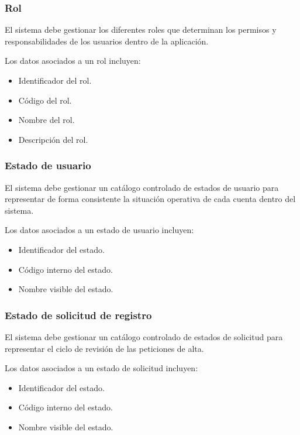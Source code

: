 \subsubsection*{Rol}

El sistema debe gestionar los diferentes roles que determinan los permisos y
responsabilidades de los usuarios dentro de la aplicación.

Los datos asociados a un rol incluyen:

\begin{itemize}
    \item Identificador del rol.
    \item Código del rol.
    \item Nombre del rol.
    \item Descripción del rol.
\end{itemize}

\subsubsection*{Estado de usuario}

El sistema debe gestionar un catálogo controlado de estados de usuario para representar de forma consistente la situación operativa de cada cuenta dentro del sistema.

Los datos asociados a un estado de usuario incluyen:

\begin{itemize}
    \item Identificador del estado.
    \item Código interno del estado.
    \item Nombre visible del estado.
\end{itemize}

\subsubsection*{Estado de solicitud de registro}

El sistema debe gestionar un catálogo controlado de estados de solicitud para representar el ciclo de revisión de las peticiones de alta.

Los datos asociados a un estado de solicitud incluyen:

\begin{itemize}
    \item Identificador del estado.
    \item Código interno del estado.
    \item Nombre visible del estado.
\end{itemize}

